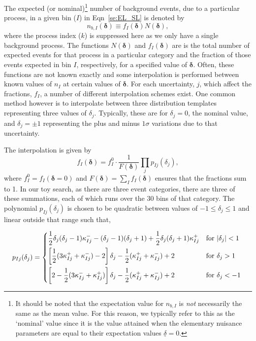 \documentclass[11pt]{article}
\begin{document}
The expected (or nominal)\footnote{It should be noted that the expectation value for $n_{b,I}$ is \emph{not} necessarily the same as the mean value. For this reason, we typically refer
to this as the `nominal' value since it is the value attained when the elementary nuisance parameters are equal to their expectation values $\underline{\delta}=0$.} number of background events, due to a particular process, in a given bin ($I$) in Eqn~\ref{se:EL_SL} is denoted by
%
\begin{equation}
  n_{b,I}(\bm{\delta}) \equiv %
  f_{I}(\bm{\delta}) N(\bm{\delta}),
\end{equation}
%
where the process index ($k$) is suppressed here as we only have a single background process. The functions $N(\bm{\delta})$ and  $f_{I}(\bm{\delta})$ are is the total number of expected events for that process in a particular
category and the fraction of those events expected in bin $I$, respectively, for a specified value of $\bm{\delta}$. Often, these functions are not known exactly and some interpolation is performed between known
values of $n_{I}$ at certain values of $\bm{\delta}$. For each uncertainty, $j$, which affect the fractions, $f_{I}$, a number of different interpolation schemes exist. One common method however is to interpolate between
three distribution templates representing three values of $\delta_{j}$. Typically, these are for $\delta_{j}=0$, the nominal value, and $\delta_{j}=\pm1$ representing the plus and minus $1\sigma$ variations due to that uncertainty.

The interpolation is given by
%
\begin{equation}
 f_{I}(\bm{\delta}) = f_{I}^{0}\cdot\frac{1}{F(\bm{\delta})} \prod_{j} p_{Ij}(\delta_{j}),
 \label{eqn:frac_function}
\end{equation}
%
where $f_{I}^{0}=f_{I}(\bm{\delta}=0)$ and $F(\bm{\delta})=\sum_{I}f_{I}(\bm{\delta})$ ensures that the fractions sum to 1. In our toy search, as there are three event categories,
there are three of these summations, each of which runs over the 30 bins of that category. The polynomial $p_{Ij}(\delta_{j})$ is chosen to be quadratic between values of $-1 \leq \delta_{j} \leq 1$
and linear outside that range such that,

\begin{equation}
 p_{Ij}(\delta_{j}) = \begin{dcases*}
 		\frac{1}{2} \delta_{j}(\delta_{j}-1) \kappa_{Ij}^{-}  -(\delta_{j}-1)(\delta_{j}+1) + \frac{1}{2}\delta_{j}(\delta_{j}+1)\kappa_{Ij}^{+} & for $|\delta_{j}|<1$ \\
        \left[ \frac{1}{2}(3\kappa_{Ij}^{+} + \kappa_{Ij}^{-})-2\right]\delta_{j} - \frac{1}{2}(\kappa_{Ij}^{+}+\kappa_{Ij}^{-})+2 & for $\delta_{j}>1$ \\
         \left[2-\frac{1}{2}(3\kappa_{Ij}^{-} + \kappa_{Ij}^{+})\right]\delta_{j} - \frac{1}{2}(\kappa_{Ij}^{+}+\kappa_{Ij}^{-})+2 & for $\delta_{j}<-1$ \\
    \end{dcases*}
\end{equation}
\end{document}

